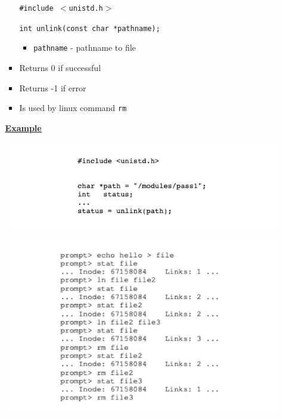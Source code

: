 \documentclass[12pt]{article}
\begin{document}
\begin{itemize}
\begin{itemize}
\begin{itemize}
            \bigskip
            \texttt{\#include $<$unistd.h$>$}

            \bigskip

            \texttt{int unlink(const char *pathname);}

            \bigskip

            \begin{itemize}
                \item \texttt{pathname} - pathname to file
            \end{itemize}
            \item Returns 0 if successful
            \item Returns -1 if error
            \item Is used by linux command \texttt{rm}
        \end{itemize}

        \bigskip

        \underline{\textbf{Example}}

        \begin{center}
        \includegraphics[width=\linewidth]{../images/midterm_4_solution_17.png}
        \includegraphics[width=\linewidth]{../images/midterm_4_solution_18.png}
        \end{center}
    \end{itemize}
\end{itemize}
\end{document}
